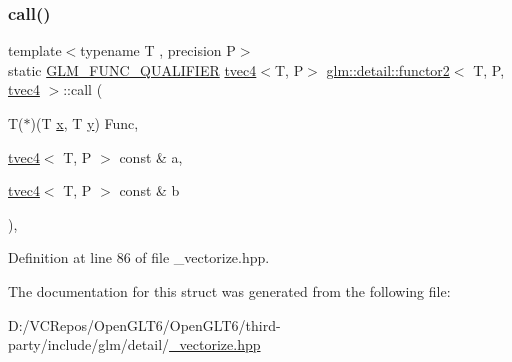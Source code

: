 \subsubsection{\texorpdfstring{call()}{call()}}
{\footnotesize\ttfamily template$<$typename T , precision P$>$ \\
static \mbox{\hyperlink{setup_8hpp_a33fdea6f91c5f834105f7415e2a64407}{G\+L\+M\+\_\+\+F\+U\+N\+C\+\_\+\+Q\+U\+A\+L\+I\+F\+I\+ER}} \mbox{\hyperlink{structglm_1_1tvec4}{tvec4}}$<$T, P$>$ \mbox{\hyperlink{structglm_1_1detail_1_1functor2}{glm\+::detail\+::functor2}}$<$ T, P, \mbox{\hyperlink{structglm_1_1tvec4}{tvec4}} $>$\+::call (\begin{DoxyParamCaption}\item[{T($\ast$)(T \mbox{\hyperlink{glad_8h_a92d0386e5c19fb81ea88c9f99644ab1d}{x}}, T \mbox{\hyperlink{glad_8h_a66ddd433d2cacfe27f5906b7e86faeed}{y}})}]{Func,  }\item[{\mbox{\hyperlink{structglm_1_1tvec4}{tvec4}}$<$ T, P $>$ const \&}]{a,  }\item[{\mbox{\hyperlink{structglm_1_1tvec4}{tvec4}}$<$ T, P $>$ const \&}]{b }\end{DoxyParamCaption})\hspace{0.3cm}{\ttfamily [inline]}, {\ttfamily [static]}}



Definition at line 86 of file \+\_\+vectorize.\+hpp.



The documentation for this struct was generated from the following file\+:\begin{DoxyCompactItemize}
\item 
D\+:/\+V\+C\+Repos/\+Open\+G\+L\+T6/\+Open\+G\+L\+T6/third-\/party/include/glm/detail/\mbox{\hyperlink{__vectorize_8hpp}{\+\_\+vectorize.\+hpp}}\end{DoxyCompactItemize}
